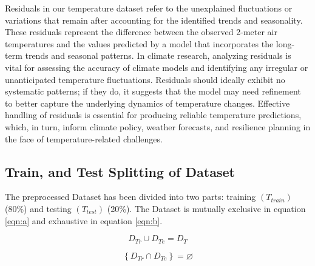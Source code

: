 \documentclass[sn-mathphys,Numbered]{sn-jnl}
\theoremstyle{thmstyleone}
\theoremstyle{thmstyletwo}
\theoremstyle{thmstylethree}
\begin{document}
Residuals in our temperature dataset refer to the unexplained fluctuations or variations that remain after accounting for the identified trends and seasonality. These residuals represent the difference between the observed 2-meter air temperatures and the values predicted by a model that incorporates the long-term trends and seasonal patterns. In climate research, analyzing residuals is vital for assessing the accuracy of climate models and identifying any irregular or unanticipated temperature fluctuations. Residuals should ideally exhibit no systematic patterns; if they do, it suggests that the model may need refinement to better capture the underlying dynamics of temperature changes. Effective handling of residuals is essential for producing reliable temperature predictions, which, in turn, inform climate policy, weather forecasts, and resilience planning in the face of temperature-related challenges.
\subsection{Train, and Test Splitting of Dataset}

 The preprocessed Dataset has been divided into two parts: training \((T_{train})\) (80\%) and testing \((T_{test})\) (20\%). The Dataset is mutually exclusive in equation \ref{eqn:a} and exhaustive in equation \ref{eqn:b}.

\begin{equation}
\label{eqn:a}
D_{Tr}\cup D_{Te}=D_{T}
\end{equation}

\begin{equation}
\label{eqn:b}
\left \{ D_{Tr} \cap D_{Te} \right \}=\varnothing 
\end{equation}





\end{document}
